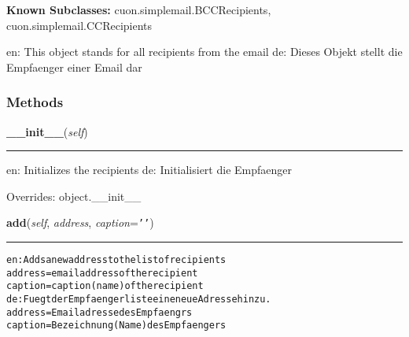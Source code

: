 \textbf{Known Subclasses:}
cuon.simplemail.BCCRecipients,
    cuon.simplemail.CCRecipients

en: This object stands for all recipients from the email de: Dieses Objekt 
stellt die Empfaenger einer Email dar



  \subsubsection{Methods}

    \vspace{0.5ex}

\hspace{.8\funcindent}\begin{boxedminipage}{\funcwidth}

    \raggedright \textbf{\_\_init\_\_}(\textit{self})

    \vspace{-1.5ex}

    \rule{\textwidth}{0.5\fboxrule}
\setlength{\parskip}{2ex}
    en: Initializes the recipients de: Initialisiert die Empfaenger

\setlength{\parskip}{1ex}
      Overrides: object.\_\_init\_\_

    \end{boxedminipage}

    \label{cuon:simplemail:Recipients:add}

    \vspace{0.5ex}

\hspace{.8\funcindent}\begin{boxedminipage}{\funcwidth}

    \raggedright \textbf{add}(\textit{self}, \textit{address}, \textit{caption}={\tt \texttt{'}\texttt{}\texttt{'}})

    \vspace{-1.5ex}

    \rule{\textwidth}{0.5\fboxrule}
\setlength{\parskip}{2ex}
\begin{alltt}

en: Adds a new address to the list of recipients
    address = email address of the recipient
    caption = caption (name) of the recipient
de: Fuegt der Empfaengerliste eine neue Adresse hinzu.
    address = Emailadresse des Empfaengrs
    caption = Bezeichnung (Name) des Empfaengers
\end{alltt}

\setlength{\parskip}{1ex}
    \end{boxedminipage}

